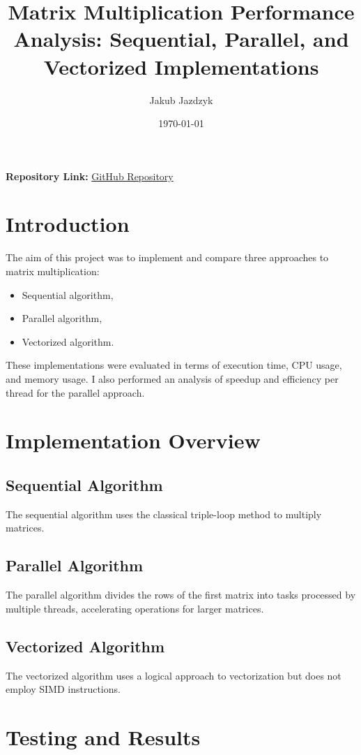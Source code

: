 \documentclass[a4paper,12pt]{article}
\title{Matrix Multiplication Performance Analysis: Sequential, Parallel, and Vectorized Implementations}
\author{Jakub Jazdzyk}
\date{\today}
\begin{document}
\maketitle

\noindent
\textbf{Repository Link:} \href{https://github.com/kubajaz/BIG_DATA_INDIVIDUAL_TASKS_JAKUB_JAZDZYK}{GitHub Repository}

\section{Introduction}

The aim of this project was to implement and compare three approaches to matrix multiplication:
\begin{itemize}
    \item Sequential algorithm,
    \item Parallel algorithm,
    \item Vectorized algorithm.
\end{itemize}
These implementations were evaluated in terms of execution time, CPU usage, and memory usage. I also performed an analysis of speedup and efficiency per thread for the parallel approach.

\section{Implementation Overview}

\subsection{Sequential Algorithm}
The sequential algorithm uses the classical triple-loop method to multiply matrices.

\subsection{Parallel Algorithm}
The parallel algorithm divides the rows of the first matrix into tasks processed by multiple threads, accelerating operations for larger matrices.

\subsection{Vectorized Algorithm}
The vectorized algorithm uses a logical approach to vectorization but does not employ SIMD instructions.

\section{Testing and Results}
\end{document}
